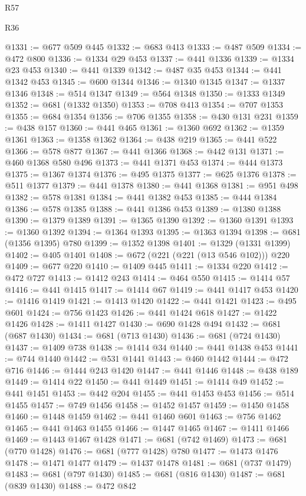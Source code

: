 \begin{lexlean}{R57}
\begin{lexlean}{R36}
\begin{coremodule}
{{{{{{{{{{{{{{{{{{{{{{{{{{{{{{{{{{{{{{{{{{{{{{{{{{{{{{{{{{{{{{{{{{{{{{{{{{{{{{{{{{@1331 := @677 @509 @445
@1332 := @683 @413
@1333 := @487 @509
@1334 := @472 @800
@1336 := @1334 @29 @453
@1337 := @441 @1336
@1339 := @1334 @23 @453
@1340 := @441 @1339
@1342 := @487 @35 @453
@1344 := @441 @1342 @453
@1345 := @600 @1344
@1346 := @1340 @1345
@1347 := @1337 @1346
@1348 := @514 @1347
@1349 := @564 @1348
@1350 := @1333 @1349
@1352 := @681 (@1332 @1350)
@1353 := @708 @413
@1354 := @707 @1353
@1355 := @684 @1354
@1356 := @706 @1355
@1358 := @430 @131 @231
@1359 := @438 @157
@1360 := @441 @465
@1361 := @1360 @692
@1362 := @1359 @1361
@1363 := @1358 @1362
@1364 := @438 @219
@1365 := @441 @522
@1366 := @578 @877
@1367 := @441 @1366
@1368 := @442 @131
@1371 := @460 @1368 @580 @496
@1373 := @441 @1371 @453
@1374 := @444 @1373
@1375 := @1367 @1374
@1376 := @495 @1375
@1377 := @625 @1376
@1378 := @511 @1377
@1379 := @441 @1378
@1380 := @441 @1368
@1381 := @951 @498
@1382 := @578 @1381
@1384 := @441 @1382 @453
@1385 := @444 @1384
@1386 := @578 @1385
@1388 := @441 @1386 @453
@1389 := @1380 @1388
@1390 := @1379 @1389
@1391 := @1365 @1390
@1392 := @1360 @1391
@1393 := @1360 @1392
@1394 := @1364 @1393
@1395 := @1363 @1394
@1398 := @681 (@1356 @1395) @780
@1399 := @1352 @1398
@1401 := @1329 (@1331 @1399)
@1402 := @405 @1401
@1408 := @672 (@221 (@221 (@13 @546 @102))) @220
@1409 := @677 @220
@1410 := @1409 @445
@1411 := @1334 @220
@1412 := @472 @727
@1413 := @1412 @243
@1414 := @464 @550
@1415 := @1414 @57
@1416 := @441 @1415
@1417 := @1414 @67
@1419 := @441 @1417 @453
@1420 := @1416 @1419
@1421 := @1413 @1420
@1422 := @441 @1421
@1423 := @495 @601
@1424 := @756 @1423
@1426 := @441 @1424 @618
@1427 := @1422 @1426
@1428 := @1411 @1427
@1430 := @690 @1428 @494
@1432 := @681 (@687 @1430)
@1434 := @681 (@713 @1430)
@1436 := @681 (@724 @1430)
@1437 := @1409 @738
@1438 := @1414 @34
@1440 := @441 @1438 @453
@1441 := @744 @1440
@1442 := @531 @1441
@1443 := @460 @1442
@1444 := @472 @716
@1446 := @1444 @243 @1420
@1447 := @441 @1446
@1448 := @438 @189
@1449 := @1414 @22
@1450 := @441 @1449
@1451 := @1414 @49
@1452 := @441 @1451
@1453 := @442 @204
@1455 := @441 @1453 @453
@1456 := @514 @1455
@1457 := @749 @1456
@1458 := @1452 @1457
@1459 := @1450 @1458
@1460 := @1448 @1459
@1462 := @441 @1460 @601
@1463 := @756 @1462
@1465 := @441 @1463 @1455
@1466 := @1447 @1465
@1467 := @1411 @1466
@1469 := @1443 @1467 @1428
@1471 := @681 (@742 @1469)
@1473 := @681 (@770 @1428)
@1476 := @681 (@777 @1428) @780
@1477 := @1473 @1476
@1478 := @1471 @1477
@1479 := @1437 @1478
@1481 := @681 (@737 @1479)
@1483 := @681 (@797 @1430)
@1485 := @681 (@816 @1430)
@1487 := @681 (@839 @1430)
@1488 := @472 @842
}}}}}}}}}}}}}}}}}}}}}}}}}}}}}}}}}}}}}}}}}}}}}}}}}}}}}}}}}}}}}}}}}}}}}}}}}}}}}}}}}}
\end{coremodule}
\end{lexlean}
\end{lexlean}

